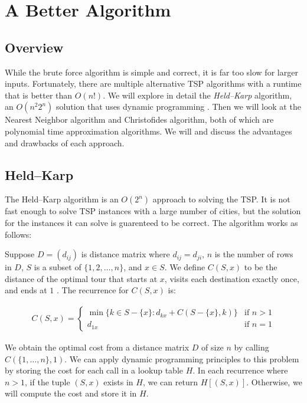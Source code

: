 \documentclass[11pt,fleqn]{article}
\begin{document}
\section{A Better Algorithm}
\subsection{Overview}
While the brute force algorithm is simple and correct, it
is far too slow for larger inputs.  Fortunately, there are multiple
alternative TSP algorithms with a runtime
that is better than $O(n!)$.  We will explore in detail the
\textit{Held--Karp} algorithm, an $O(n^2 2^n)$ solution that uses
dynamic programming \cite{heldkarp}.  Then we will look at the Nearest
Neighbor algorithm and Christofides algorithm, both of which are polynomial
time approximation algorithms.  We will and discuss the advantages
and drawbacks of each approach. 

\subsection{Held--Karp}
The Held--Karp algorithm is an $O(2^n)$ approach to solving the TSP\@.
It is not fast enough to solve TSP instances with a large number of
cities, but the solution for the instances it can solve is guarenteed
to be correct.  The algorithm works as follows:
\par

Suppose $D = (d_{ij})$ is distance
matrix where $d_{ij} = d_{ji}$, $n$ is the number of rows in $D$,
$S$ is a subset of $\{1, 2,\dots,n\}$, and $x\in S$.  We define $C(S, x)$
to be the distance of the optimal tour that starts at $x$, visits each
destination exactly once, and ends at $1$ \cite{heldkarp}.  The recurrence
for $C(S,x)$ is:

\begin{align*}
  C(S, x)=\begin{cases}
    \min\{k\in S-\{x\} : d_{kx} + C(S-\{x\}, k) \}  & \text{if } n>1 \\
    d_{1x}                                          & \text{if } n=1
  \end{cases}
\end{align*}

We obtain the optimal cost from a distance matrix $D$ of size $n$ by calling
$C(\{1,\dots,n\}, 1)$.  We can apply dynamic programming principles to this
problem by storing the cost for each call in a lookup table $H$.  In each
recurrence where $n>1$, if the tuple $(S, x)$ exists in $H$, we can return
$H[(S, x)]$.  Otherwise,  we will compute the cost and store it in $H$.
\par
\end{document}
